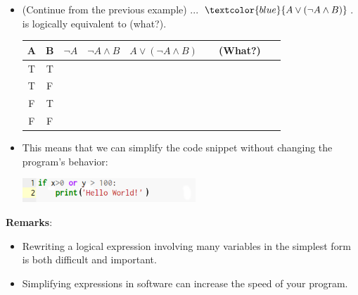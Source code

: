 \documentclass[aspectratio=169]{beamer}
\providecommand{\Blue}[1]{\textcolor{blue}{#1}}
\begin{document}
\begin{frame}[plain]{ }
 \begin{itemize}
      \item (Continue from the previous example) ...  $\Blue{A\vee (\neg A \wedge B)}$.
         is logically equivalent to (what?).
         \begin{center}
        \begin{tabular}{|c|c|c|c|c|c|}\hline
          A & B & $\neg A$ & $\neg A \wedge B$ & $A\vee (\neg A \wedge B)$ &   \ \ (What?) \ \ \\ \hline
            T  &  T  &  & & & \\ \hline
            T  &  F & & & &\\ \hline 
            F	& T &  & & & \\ \hline
            F   &  F & & & & \\ \hline            
        \end{tabular}
	\end{center}\pause
     \item This means that we can simplify the code snippet without changing the program's behavior:
        \begin{center}
       \includegraphics[height=0.9cm]{./img/lecture14-fig4.png}
      \end{center}
      \pause
    \end{itemize}
  
 
{\bf Remarks}:
  \begin{itemize}
      \item Rewriting a logical expression involving many variables in the simplest form is
        both difficult and important.
       \item Simplifying expressions in software can increase the speed of your program.
    \end{itemize}
\end{frame}
\end{document}
